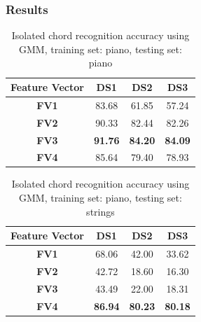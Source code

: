\documentclass{beamer}
\begin{document}
\begin{frame}
	\frametitle{Results}
	
\begin{table}\small
\centering
\begin{tabular}{|c|c|c|c|} \hline
\textbf{Feature Vector} & \textbf{DS1} & \textbf{DS2} & \textbf{DS3} \\ \hline
\textbf{FV1} & 83.68 & 61.85 & 57.24 \\ \hline
\textbf{FV2} & 90.33 & 82.44 & 82.26 \\ \hline
\textbf{FV3} & \textbf{91.76} & \textbf{84.20} & \textbf{84.09} \\ \hline
\textbf{FV4} & 85.64 & 79.40 & 78.93 \\ \hline
\end{tabular}
\caption{Isolated chord recognition accuracy using GMM, training set: piano, testing set: piano}
\label{tab:tab3}
\end{table} 

\begin{table}\small
\centering
\begin{tabular}{|c|c|c|c|} \hline
\textbf{Feature Vector} & \textbf{DS1} & \textbf{DS2} & \textbf{DS3} \\ \hline
\textbf{FV1} & 68.06 & 42.00 & 33.62 \\ \hline
\textbf{FV2} & 42.72 & 18.60 & 16.30 \\ \hline
\textbf{FV3} & 43.49 & 22.00 & 18.31 \\ \hline
\textbf{FV4} & \textbf{86.94} & \textbf{80.23} & \textbf{80.18} \\ \hline
\end{tabular}
\caption{Isolated chord recognition accuracy using GMM, training set: piano, testing set: strings}
\label{tab:tab4}
\end{table}



\end{frame}
\end{document}
